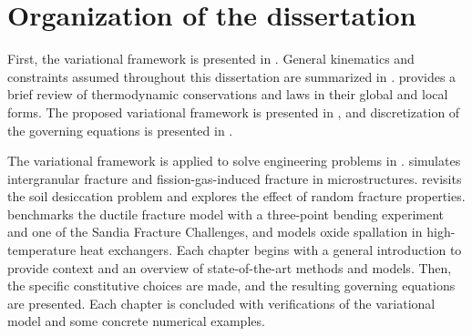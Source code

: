 \section{Organization of the dissertation}

First, the variational framework is presented in . General kinematics and constraints assumed throughout this dissertation are summarized in .  provides a brief review of thermodynamic conservations and laws in their global and local forms.
The proposed variational framework is presented in , and discretization of the governing equations is presented in .

The variational framework is applied to solve engineering problems in .  simulates intergranular fracture and fission-gas-induced fracture in microstructures.  revisits the soil desiccation problem and explores the effect of random fracture properties.  benchmarks the ductile fracture model with a three-point bending experiment and one of the Sandia Fracture Challenges, and models oxide spallation in high-temperature heat exchangers. Each chapter begins with a general introduction to provide context and an overview of state-of-the-art methods and models. Then, the specific constitutive choices are made, and the resulting governing equations are presented. Each chapter is concluded with verifications of the variational model and some concrete numerical examples.
